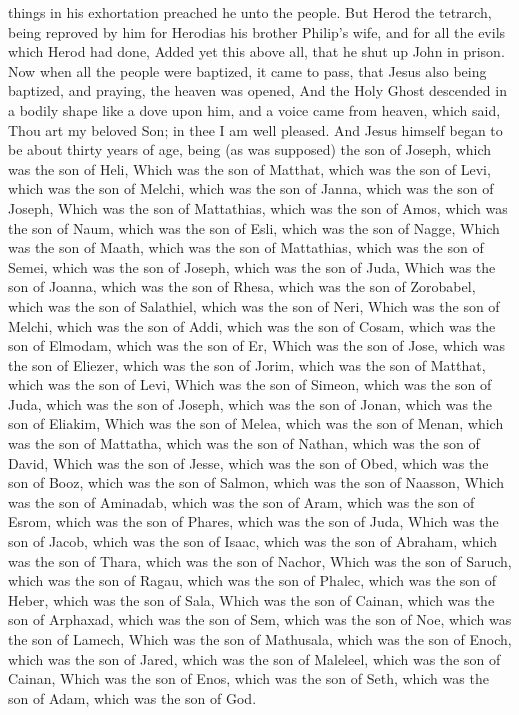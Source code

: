 things in his exhortation preached he unto the people.  But
Herod the tetrarch, being reproved by him for Herodias his brother
Philip's wife, and for all the evils which Herod had done, 
Added yet this above all, that he shut up John in prison. 
Now when all the people were baptized, it came to pass, that Jesus also
being baptized, and praying, the heaven was opened,  And
the Holy Ghost descended in a bodily shape like a dove upon him, and a
voice came from heaven, which said, Thou art my beloved Son; in thee I
am well pleased.  And Jesus himself began to be about
thirty years of age, being (as was supposed) the son of Joseph, which
was the son of Heli,  Which was the son of Matthat, which
was the son of Levi, which was the son of Melchi, which was the son of
Janna, which was the son of Joseph,  Which was the son of
Mattathias, which was the son of Amos, which was the son of Naum, which
was the son of Esli, which was the son of Nagge,  Which was
the son of Maath, which was the son of Mattathias, which was the son of
Semei, which was the son of Joseph, which was the son of Juda,
 Which was the son of Joanna, which was the son of Rhesa,
which was the son of Zorobabel, which was the son of Salathiel, which
was the son of Neri,  Which was the son of Melchi, which
was the son of Addi, which was the son of Cosam, which was the son of
Elmodam, which was the son of Er,  Which was the son of
Jose, which was the son of Eliezer, which was the son of Jorim, which
was the son of Matthat, which was the son of Levi,  Which
was the son of Simeon, which was the son of Juda, which was the son of
Joseph, which was the son of Jonan, which was the son of Eliakim,
 Which was the son of Melea, which was the son of Menan,
which was the son of Mattatha, which was the son of Nathan, which was
the son of David,  Which was the son of Jesse, which was
the son of Obed, which was the son of Booz, which was the son of Salmon,
which was the son of Naasson,  Which was the son of
Aminadab, which was the son of Aram, which was the son of Esrom, which
was the son of Phares, which was the son of Juda,  Which
was the son of Jacob, which was the son of Isaac, which was the son of
Abraham, which was the son of Thara, which was the son of Nachor,
 Which was the son of Saruch, which was the son of Ragau,
which was the son of Phalec, which was the son of Heber, which was the
son of Sala,  Which was the son of Cainan, which was the
son of Arphaxad, which was the son of Sem, which was the son of Noe,
which was the son of Lamech,  Which was the son of
Mathusala, which was the son of Enoch, which was the son of Jared, which
was the son of Maleleel, which was the son of Cainan, 
Which was the son of Enos, which was the son of Seth, which was the son
of Adam, which was the son of God.

